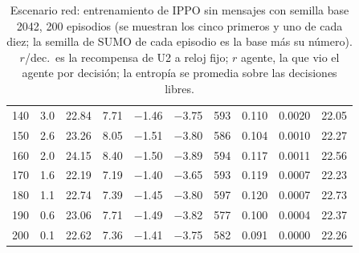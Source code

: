 \begin{table}[H]
\begin{tabular}{rrrrrrrrrr}
140 & 3.0 & 22.84 & 7.71 & $-$1.46 & $-$3.75 & 593 & 0.110 & 0.0020 & 22.05 \\
150 & 2.6 & 23.26 & 8.05 & $-$1.51 & $-$3.80 & 586 & 0.104 & 0.0010 & 22.27 \\
160 & 2.0 & 24.15 & 8.40 & $-$1.50 & $-$3.89 & 594 & 0.117 & 0.0011 & 22.56 \\
170 & 1.6 & 22.19 & 7.19 & $-$1.40 & $-$3.65 & 593 & 0.119 & 0.0007 & 22.23 \\
180 & 1.1 & 22.74 & 7.39 & $-$1.45 & $-$3.80 & 597 & 0.120 & 0.0007 & 22.73 \\
190 & 0.6 & 23.06 & 7.71 & $-$1.49 & $-$3.82 & 577 & 0.100 & 0.0004 & 22.37 \\
200 & 0.1 & 22.62 & 7.36 & $-$1.41 & $-$3.75 & 582 & 0.091 & 0.0000 & 22.26 \\
\bottomrule
\end{tabular}
\caption[Escenario red: entrenamiento de IPPO sin mensajes, semilla base 2042]{Escenario red: entrenamiento de IPPO sin mensajes con semilla base 2042, 200 episodios (se muestran los cinco primeros y uno de cada diez; la semilla de SUMO de cada episodio es la base más su número). $r$/dec.\ es la recompensa de U2 a reloj fijo; $r$ agente, la que vio el agente por decisión; la entropía se promedia sobre las decisiones libres.}
\label{tab:red-ippo-local-2042}
\end{table}

